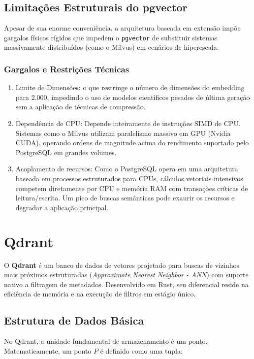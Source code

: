 \documentclass[a4paper, 12pt]{article} %
\begin{document}
\subsection{Limitações Estruturais do pgvector}
Apesar de sua enorme conveniência, a arquitetura baseada em extensão impõe gargalos físicos rígidos que impedem o \texttt{pgvector} de substituir sistemas massivamente distribuídos (como o Milvus) em cenários de hiperescala.

\subsubsection{Gargalos e Restrições Técnicas}

\begin{enumerate}
    \item Limite de Dimensões: o que restringe o número de dimensões do embedding para 2.000, impedindo o uso de modelos científicos pesados de última geração sem a aplicação de técnicas de compressão.
    \item Dependência de CPU: Depende inteiramente de instruções SIMD de CPU. Sistemas como o Milvus utilizam paralelismo massivo em GPU (Nvidia CUDA), operando ordens de magnitude acima do rendimento suportado pelo PostgreSQL em grandes volumes.
    \item Acoplamento de recursos: Como o PostgreSQL opera em uma arquitetura baseada em processos estruturados para CPUs, cálculos vetoriais intensivos competem diretamente por CPU e memória RAM com transações críticas de leitura/escrita. Um pico de buscas semânticas pode exaurir os recursos e degradar a aplicação principal.
\end{enumerate}

\section{ Qdrant }
O \textbf{Qdrant} é um banco de dados de vetores projetado para buscas de vizinhos mais próximos estruturadas (\textit{Approximate Nearest Neighbor - ANN}) com suporte nativo a filtragem de metadados. Desenvolvido em Rust, seu diferencial reside na eficiência de memória e na execução de filtros em estágio único.

\subsection{Estrutura de Dados Básica}
No Qdrant, a unidade fundamental de armazenamento é um ponto. Matematicamente, um ponto $P$ é definido como uma tupla:
\end{document}
